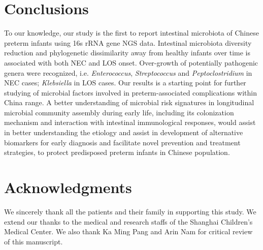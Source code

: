 \documentclass[fleqn,10pt]{wlpeerj} %
\begin{document}
\section*{Conclusions}
To our knowledge, our study is the first to report intestinal microbiota of Chinese preterm infants using 16s rRNA gene NGS data. Intestinal microbiota diversity reduction and phylogenetic dissimilarity away from healthy infants over time is associated with both NEC and LOS onset. Over-growth  of potentially pathogenic genera were recognized, i.e. \textit{Enterococcus}, \textit{Streptococcus} and \textit{Peptoclostridium} in NEC cases; \textit{Klebsiella} in LOS cases. Our results is a starting point for further studying of microbial factors involved in preterm-associated complications within China range. A better understanding of microbial risk signatures in longitudinal microbial community assembly during early life, including its colonization mechanism and interaction with intestinal immunological responses, would assist in better understanding the etiology and assist in development of alternative biomarkers for early diagnosis and facilitate novel prevention and treatment strategies, to protect predisposed preterm infants in Chinese population.

\section*{Acknowledgments}
We sincerely thank all the patients and their family  in  supporting  this study. We extend our thanks to the medical and research staffs of the Shanghai Children’s Medical Center.  We also thank Ka Ming Pang and Arin Nam for critical review of this manuscript.









\end{document}
